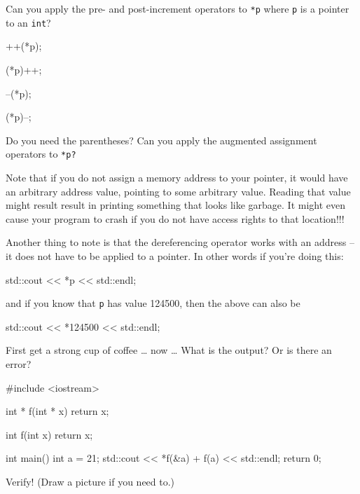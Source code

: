 \begin{ex}
Can you apply the pre- and post-increment operators to \texttt{*p} where \texttt{p} is a pointer to an \texttt{int}?

\begin{consolethree}[escapeinside=||]
++(*p);

(*p)++;

--(*p);

(*p)--;
\end{consolethree}
\end{ex}

Do you need the parentheses? Can you apply the augmented assignment operators to \texttt{*p?}

Note that if you do not assign a memory address to your pointer, it would have an arbitrary address value, pointing to some arbitrary value.
Reading that value might result result in printing something that looks like garbage. It might even cause your program to crash if you do not have access rights to that location!!!

Another thing to note is that the dereferencing operator works with an address -- it does not have to be applied to a pointer. In other words if you're doing this:

\begin{consolethree}[escapeinside=||]
std::cout << *p << std::endl;
\end{consolethree}

and if you know that \texttt{p} has value 124500, then the above can also be

\begin{consolethree}[escapeinside=||]
std::cout << *124500 << std::endl;
\end{consolethree}

\begin{ex}
First get a strong cup of coffee \ldots{} now \ldots{} What is the output? Or is there an error?

\begin{consolethree}[escapeinside=||]
#include <iostream>

int * f(int * x)
{   
    return x;
}

int f(int x)
{   
    return x;
}

int main()
{   
    int a = 21;
    std::cout << *f(&a) + f(a) << std::endl;
    return 0;
}
\end{consolethree}
Verify! (Draw a picture if you need to.)
\end{ex}

